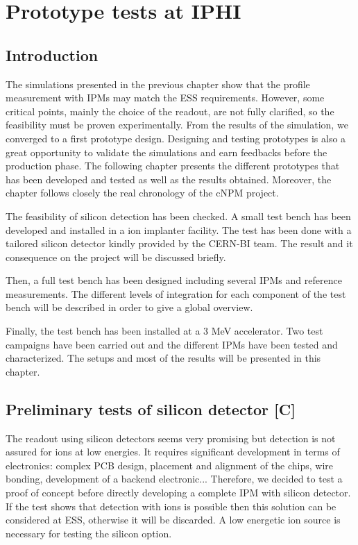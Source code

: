 \chapter{Prototype tests at IPHI}
\cleardoublepage

\minitoc

\section{Introduction}
\begin{refsection}
  \label{ch4:Introduction [C]}
  The simulations presented in the previous chapter show that the profile measurement with IPMs may match the ESS requirements. However, some critical points, mainly the choice of the readout, are not fully clarified, so the feasibility must be proven experimentally. From the results of the simulation, we converged to a first prototype design. Designing and testing prototypes is also a great opportunity to validate the simulations and earn feedbacks before the production phase. The following chapter presents the different prototypes that has been developed and tested as well as the results obtained. Moreover, the chapter follows closely the real chronology of the cNPM project.

  The feasibility of silicon detection has been checked. A small test bench has been developed and installed in a ion implanter facility. The test has been done with a tailored silicon detector kindly provided by the CERN-BI team. The result and it consequence on the project will be discussed briefly.

  Then, a full test bench has been designed including several IPMs and reference measurements. The different levels of integration for each component of the test bench will be described in order to give a global overview.

  Finally, the test bench has been installed at a 3 MeV accelerator. Two test campaigns have been carried out and the different IPMs have been tested and characterized. The setups and most of the results will be presented in this chapter.

  \section{Preliminary tests of silicon detector [C]}
  The readout using silicon detectors seems very promising but detection is not assured for ions at low energies. It requires significant development in terms of electronics: complex PCB design, placement and alignment of the chips, wire bonding, development of a backend electronic... Therefore, we decided to test a proof of concept before directly developing a complete IPM with silicon detector. If the test shows that detection with ions is possible then this solution can be considered at ESS, otherwise it will be discarded. A low energetic ion source is necessary for testing the silicon option.


\end{refsection}
